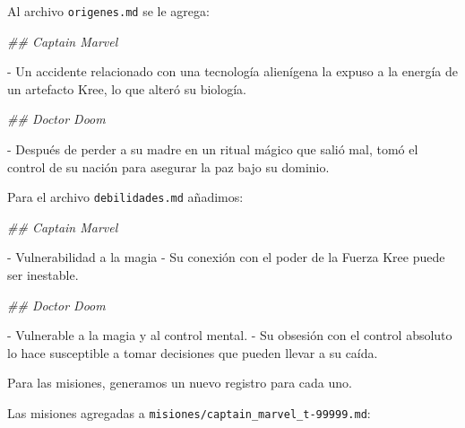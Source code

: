 \documentclass[
]{book}
\newenvironment{Shaded}{\begin{snugshade}}{\end{snugshade}}
\newcommand{\CommentTok}[1]{\textcolor[rgb]{0.56,0.35,0.01}{\textit{#1}}}
\newcommand{\ExtensionTok}[1]{#1}
\newcommand{\NormalTok}[1]{#1}
\begin{document}
Al archivo \texttt{origenes.md} se le agrega:

\begin{Shaded}
\begin{Highlighting}[]

\CommentTok{\#\# Captain Marvel}

\ExtensionTok{{-}}\NormalTok{ Un accidente relacionado con una tecnología alienígena la expuso a la energía de un artefacto Kree, lo que alteró su biología.}

\CommentTok{\#\# Doctor Doom}

\ExtensionTok{{-}}\NormalTok{ Después de perder a su madre en un ritual mágico que salió mal, tomó el control de su nación para asegurar la paz bajo su dominio.}
\end{Highlighting}
\end{Shaded}

Para el archivo \texttt{debilidades.md} añadimos:

\begin{Shaded}
\begin{Highlighting}[]

\CommentTok{\#\# Captain Marvel}

\ExtensionTok{{-}}\NormalTok{ Vulnerabilidad a la magia }
\ExtensionTok{{-}}\NormalTok{ Su conexión con el poder de la Fuerza Kree puede ser inestable.}

\CommentTok{\#\# Doctor Doom}

\ExtensionTok{{-}}\NormalTok{ Vulnerable a la magia y al control mental.}
\ExtensionTok{{-}}\NormalTok{ Su obsesión con el control absoluto lo hace susceptible a tomar decisiones que pueden llevar a su caída.}
\end{Highlighting}
\end{Shaded}

Para las misiones, generamos un nuevo registro para cada uno.

Las misiones agregadas a \texttt{misiones/captain\_marvel\_t-99999.md}:
\end{document}
